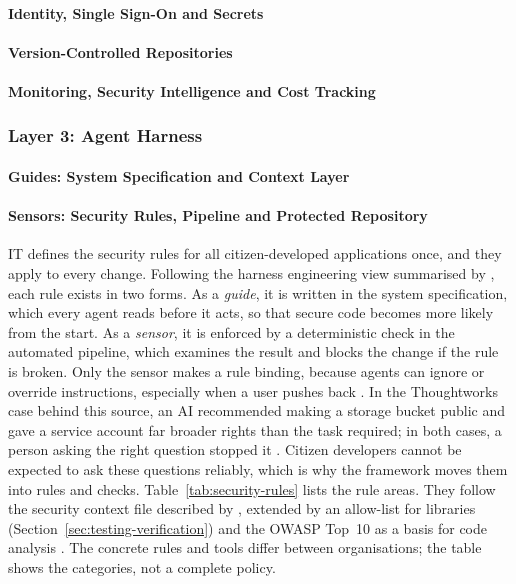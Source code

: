 \documentclass[10pt,a4paper]{article}
\begin{document}
\paragraph{Identity, Single Sign-On and Secrets}

\paragraph{Version-Controlled Repositories}

\paragraph{Monitoring, Security Intelligence and Cost Tracking}
\label{sec:monitoring}

\subsubsection{Layer 3: Agent Harness}
\label{sec:layer3}

\paragraph{Guides: System Specification and Context Layer}
\label{sec:guides}

\paragraph{Sensors: Security Rules, Pipeline and Protected Repository}
\label{sec:security-rules}
 
IT defines the security rules for all citizen-developed applications once,
and they apply to every change. Following the harness engineering view
summarised by \textcite{TODO-koul2026vibesec}, each rule exists in two
forms. As a \emph{guide}, it is written in the system specification, which
every agent reads before it acts, so that secure code becomes more likely
from the start. As a \emph{sensor}, it is enforced by a deterministic check
in the automated pipeline, which examines the result and blocks the change
if the rule is broken. Only the sensor makes a rule binding, because agents
can ignore or override instructions, especially when a user pushes back
\parencite{TODO-koul2026vibesec}. In the Thoughtworks case behind this
source, an AI recommended making a storage bucket public and gave a service
account far broader rights than the task required; in both cases, a person
asking the right question stopped it \parencite{TODO-koul2026vibesec}.
Citizen developers cannot be expected to ask these questions reliably,
which is why the framework moves them into rules and checks.
Table~\ref{tab:security-rules} lists the rule areas. They follow the
security context file described by \textcite{TODO-koul2026vibesec},
extended by an allow-list for libraries
(Section~\ref{sec:testing-verification}) and the OWASP Top~10 as a basis
for code analysis \parencite{TODO-owasptop10}. The concrete rules and tools
differ between organisations; the table shows the categories, not a
complete policy.
 
\end{document}
